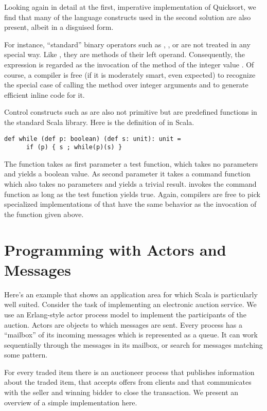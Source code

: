 \documentclass[a4paper,12pt,twoside,titlepage]{book}
\begin{document}
Looking again in detail at the first, imperative implementation of
Quicksort, we find that many of the language constructs used in the
second solution are also present, albeit in a disguised form.

For instance, ``standard'' binary operators such as \code{+},
\code{-}, or \code{<} are not treated in any special way. Like
, they are methods of their left operand. Consequently,
the expression  is regarded as the invocation
 of the \code{+} method of the integer value .
Of course, a compiler is free (if it is moderately smart, even expected)
to recognize the special case of calling the \code{+} method over
integer arguments and to generate efficient inline code for it.

Control constructs such as  are also not primitive but are
predefined functions in the standard Scala library. Here is the
definition of  in Scala.
\begin{lstlisting}
def while (def p: boolean) (def s: unit): unit =
      if (p) { s ; while(p)(s) }
\end{lstlisting}
The  function takes as first parameter a test function,
which takes no parameters and yields a boolean value. As second
parameter it takes a command function which also takes no parameters
and yields a trivial result.  invokes the command function
as long as the test function yields true. Again, compilers are free to
pick specialized implementations of  that have the same
behavior as the invocation of the function given above.

\chapter{Programming with Actors and Messages}
\label{chap:example-auction}

Here's an example that shows an application area for which Scala is
particularly well suited. Consider the task of implementing an
electronic auction service. We use an Erlang-style actor process
model to implement the participants of the auction. Actors are
objects to which messages are sent. Every process has a ``mailbox'' of
its incoming messages which is represented as a queue. It can work
sequentially through the messages in its mailbox, or search for
messages matching some pattern.

For every traded item there is an auctioneer process that publishes
information about the traded item, that accepts offers from clients
and that communicates with the seller and winning bidder to close the
transaction. We present an overview of a simple implementation
here.
\end{document}

